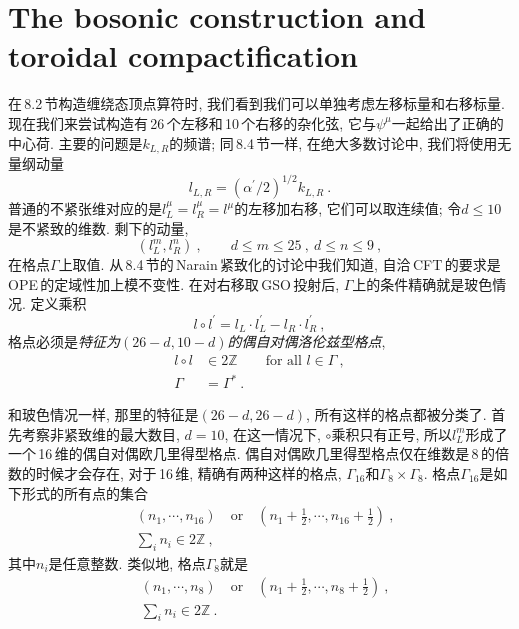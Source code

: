 \section{The bosonic construction and toroidal compactification}

在\,8.2\,节构造缠绕态顶点算符时, 我们看到我们可以单独考虑左移标量和右移标量. 现在我们来尝试构造有\,26\,个左移和\,10\,个右移的杂化弦, 它与$ \psi^{\mu} $一起给出了正确的中心荷. 主要的问题是$ k_{L,R} $的频谱; 同\,8.4\,节一样, 在绝大多数讨论中, 我们将使用无量纲动量
\begin{equation}
    l_{L,R} = (\alpha^{\prime}/2)^{1/2} k_{L,R} \:. \label{11.6.1}
\end{equation}
普通的不紧张维对应的是$ l_{L}^{\mu}=l_{R}^{\mu}=l^{\mu} $的左移加右移, 它们可以取连续值; 令$ d\leq 10 $是不紧致的维数. 剩下的动量,
\begin{equation}
    (l_{L}^{m},l_{R}^{n}) \:, \qquad d\leq m \leq 25 \:, \: d\leq n \leq 9 \:, \label{11.6.2}
\end{equation}
在格点$ \Gamma $上取值. 从\,8.4\,节的\,Narain\,紧致化的讨论中我们知道, 自洽\,CFT\,的要求是\,OPE\,的定域性加上模不变性. 在对右移取\,GSO\,投射后, $\Gamma $上的条件精确就是玻色情况. 定义乘积
\begin{equation}
    l \circ l^{\prime} = l_{L}\cdot l_{L}^{\prime} - l_{R} \cdot l_{R}^{\prime} \:, \label{11.6.3}
\end{equation}
格点必须是{\emph{特征为$ (26-d,10-d) $的偶自对偶洛伦兹型格点}},
\begin{subequations}
\begin{align}
    l \circ l & \in 2\mathds{Z} \qquad \text{for all } l\in\Gamma \:, \label{11.6.4a} \\
    \Gamma &= \Gamma^{\ast} \:. \label{11.6.4b}
\end{align} \label{11.6.4}
\end{subequations}

和玻色情况一样, 那里的特征是$ (26-d,26-d)$, 所有这样的格点都被分类了. 首先考察非紧致维的最大数目, $d=10$, 在这一情况下, $\circ $乘积只有正号, 所以$ l_{L}^{m} $形成了一个\,16\,维的偶自对偶欧几里得型格点. 偶自对偶欧几里得型格点仅在维数是\,8\,的倍数的时候才会存在, 对于\,16\,维, 精确有两种这样的格点, $\Gamma_{16} $和$ \Gamma_{8}\times \Gamma_{8}$. 格点$ \Gamma_{16} $是如下形式的所有点的集合
\begin{subequations}
\begin{align}
    &(n_{1},\cdots,n_{16})\quad \text{or} \quad (n_{1}+\tfrac{1}{2},\cdots ,n_{16}+\tfrac{1}{2}) \:, \label{11.6.5a} \\
    &\sum_{i}n_{i} \in 2\mathds{Z} \:, \label{11.6.5b}
\end{align}  \label{11.6.5}
\end{subequations}
其中$ n_{i} $是任意整数. 类似地, 格点$ \Gamma_{8} $就是
\begin{subequations}
\begin{align}
    &(n_{1},\cdots,n_{8})\quad \text{or} \quad (n_{1}+\tfrac{1}{2},\cdots ,n_{8}+\tfrac{1}{2}) \:, \label{11.6.6a} \\
    &\sum_{i}n_{i} \in 2\mathds{Z} \:. \label{11.6.6b}
\end{align} \label{11.6.6}
\end{subequations}


